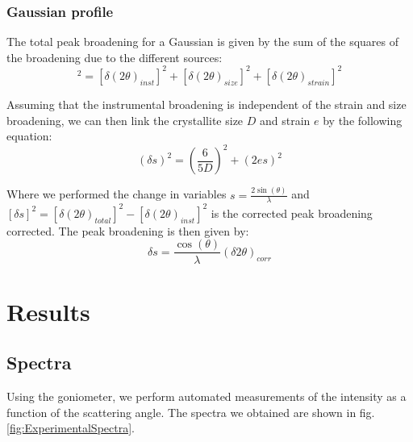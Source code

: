 \documentclass[12pt]{article}
\begin{document}
\subsubsection{Gaussian profile}

The total peak broadening for a Gaussian is given by the sum of the squares of the broadening due to the  different sources:
\begin{equation}
    [\delta(2\theta)_{total}]^2 = [\delta(2\theta)_{inst}]^2 + [\delta(2\theta)_{size}]^2 + [\delta(2\theta)_{strain}]^2 
\end{equation}

Assuming that the instrumental broadening is independent of the strain and size broadening, we can then link the crystallite size $D$ and strain $e$ by the following equation:
\begin{equation}
    (\delta s)^2 = \left( \frac{6}{5D} \right)^2 + (2e s)^2
    \label{eq:GaussianStrainSize}
\end{equation}

Where we performed the change in variables $s = \frac{2 \sin(\theta)}{\lambda}$ and $[\delta s]^2 = [\delta(2\theta)_{total}]^2 - [\delta(2\theta)_{inst}]^2$ is the corrected peak broadening corrected. The peak broadening is then given by:
\begin{equation}
    \delta s = \frac{\cos(\theta)}{\lambda}(\delta 2 \theta)_{corr}
\end{equation}



\newpage

\section{Results}

\subsection{Spectra}
Using the goniometer, we perform automated measurements of the intensity as a function of the scattering angle. The spectra we obtained are shown in fig. \ref{fig:ExperimentalSpectra}.
\end{document}
